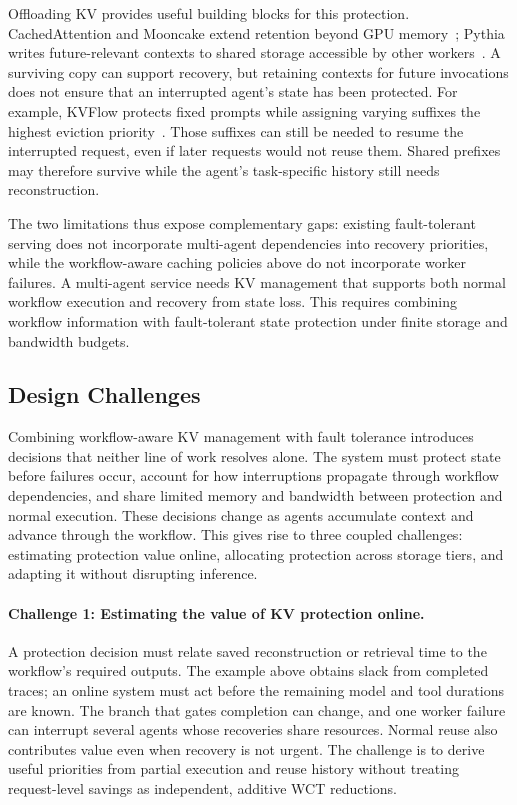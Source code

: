 Offloading KV provides useful building blocks for this protection.
CachedAttention and Mooncake extend retention beyond GPU
memory~\cite{gao2024cachedattention,qin2025mooncake}; Pythia writes
future-relevant contexts to shared storage accessible by other
workers~\cite{yu2026pythia}. A surviving copy can support recovery, but
retaining contexts for future invocations does not ensure that an
interrupted agent's state has been protected. For example, KVFlow
protects fixed prompts while assigning varying suffixes the highest
eviction priority~\cite{pan2025kvflow}. Those suffixes can still be needed
to resume the interrupted request, even if later requests would not
reuse them. Shared prefixes may therefore survive while the agent's
task-specific history still needs reconstruction.

\label{sec:motivation-long-context}
The two limitations thus expose complementary gaps: existing
fault-tolerant serving does not incorporate multi-agent dependencies
into recovery priorities, while the workflow-aware caching policies
above do not incorporate worker failures.
A multi-agent service needs KV management that supports both normal
workflow execution and recovery from state loss. This requires
combining workflow information with fault-tolerant state protection
under finite storage and bandwidth budgets.

\subsection{Design Challenges}
\label{sec:motivation-challenges}

Combining workflow-aware KV management with fault tolerance introduces
decisions that neither line of work resolves alone. The system must
protect state before failures occur, account for how interruptions
propagate through workflow dependencies, and share limited memory and
bandwidth between protection and normal execution. These decisions
change as agents accumulate context and advance through the workflow.
This gives rise to three coupled challenges: estimating protection
value online, allocating protection across storage tiers, and adapting it
without disrupting inference.

\paragraph{Challenge 1: Estimating the value of KV protection online.}
A protection decision must relate saved reconstruction or retrieval time
to the workflow's required outputs. The example above obtains slack from
completed traces; an online system must act before the remaining model
and tool durations are known. The branch that gates completion can
change, and one worker failure can interrupt several agents whose
recoveries share resources. Normal reuse also contributes value even
when recovery is not urgent. The challenge is to derive useful priorities
from partial execution and reuse history without treating request-level
savings as independent, additive WCT reductions.

